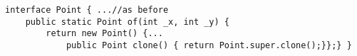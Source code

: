 \begin{lstlisting}
interface Point { ...//as before
    public static Point of(int _x, int _y) {
        return new Point() {...
            public Point clone() { return Point.super.clone();}};} }
\end{lstlisting} 

%
%
%
